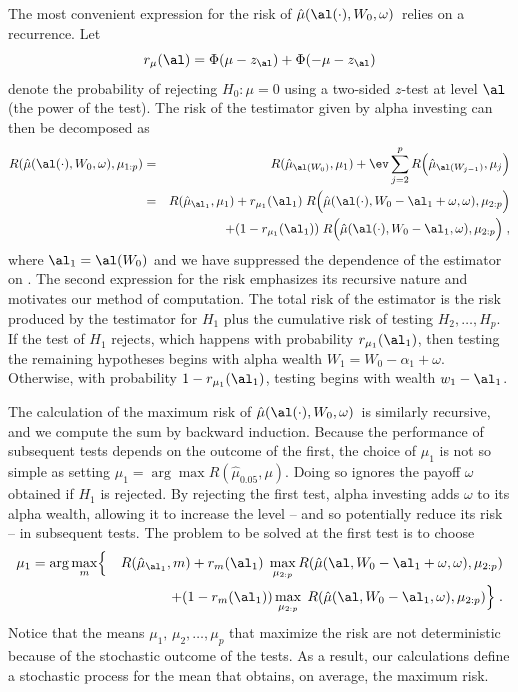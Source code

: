 \documentclass[12pt]{article}
\newcommand{\test}{\mbox{$\hat\mu(\al(\cdot),W_0,\omega)$}}
\begin{document}
 The most convenient expression for the risk of \test\ relies on a recurrence.
 Let
 \begin{displaymath}
   r_\mu(\al) = \Phi(\mu-z_\al)+\Phi(-\mu-z_\al)   
 \end{displaymath}
 denote the probability of rejecting $H_0: \mu=0$ using a two-sided $z$-test at
 level $\al$ (the power of the test).  The risk of the testimator given by alpha
 investing can then be decomposed as
 \begin{eqnarray}
   R(\hat\mu(\al(\cdot),W_0,\omega),\mu_{1:p}) 
    &=& R(\hat\mu_{\al(W_0)},\mu_1)
        + \ev \sum_{j=2}^p R\Bigl(\hat\mu_{\al(W_{j-1})},\mu_j\Bigr)  \cr
    &=& R(\hat\mu_{\al_1},\mu_1)
        + r_{\mu_1}(\al_1)\; 
          R\Bigl(\hat\mu(\al(\cdot),W_0-\al_1+\omega,\omega),\mu_{2:p}\Bigr)\cr
    & & \qquad + (1-r_{\mu_1}(\al_1))\; 
          R\Bigl(\hat\mu(\al(\cdot),W_0-\al_1,\omega),\mu_{2:p}\Bigr) \;,
 \label{eq:RMuHat}
 \end{eqnarray}
 where $\al_1 = \al(W_0)$ and we have suppressed the dependence of the estimator
 on \YY.  The second expression for the risk emphasizes its recursive nature and
 motivates our method of computation.  The total risk of the estimator is the
 risk produced by the testimator for $H_1$ plus the cumulative risk of testing
 $H_2, \ldots, H_p$.  If the test of $H_1$ rejects, which happens with
 probability $r_{\mu_1}(\al_1)$, then testing the remaining hypotheses begins
 with alpha wealth $W_1 = W_0 - \alpha_1 + \omega$.  Otherwise, with probability
 $1- r_{\mu_1}(\al_1)$, testing begins with wealth $w_1 - \al_1$.


 The calculation of the maximum risk of \test\ is similarly recursive,
 and we compute the sum by backward induction.  Because the performance of
 subsequent tests depends on the outcome of the first, the choice of $\mu_1$ is
 not so simple as setting $\mu_1 = \arg \max R(\hat\mu_{0.05}, \mu)$.  Doing so
 ignores the payoff $\omega$ obtained if $H_1$ is rejected.  By rejecting the
 first test, alpha investing adds
 $\omega$ to its alpha wealth, allowing it to increase the level -- and so
 potentially reduce its risk -- in subsequent tests.  The problem to be solved
 at the first test is to choose
 \begin{eqnarray*}
    \mu_1 = \arg \max_{m} & \Bigl\{ & R(\hat\mu_{\al_1},m) \Bigr. 
        + r_{m}(\al_1) \; \max_{\mu_{2:p}} 
              R(\hat\mu(\al,W_0-\al_1+\omega,\omega),\mu_{2:p})\cr
    & & + \Bigl. (1-r_{m}(\al_1)) \max_{\mu_{2:p}} \; 
              R(\hat\mu(\al,W_0-\al_1,\omega),\mu_{2:p}) \Bigr\} \;.
 \end{eqnarray*}
 Notice that the means $\mu_1,\, \mu_2,\ldots, \mu_p$ that maximize the risk are
 not deterministic because of the stochastic outcome of the tests.  As a result,
 our calculations define a stochastic process for the mean that obtains, on
 average, the maximum risk.
\end{document}

